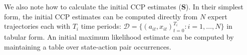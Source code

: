 \documentclass{article}
\begin{document}
We also note how to calculate the initial CCP estimates ($\mathbf{S}$). In their simplest form, the initial CCP estimates can be computed directly from $N$ expert trajectories each with $T_i$ time periods:  $\mathcal{D} = \{(a_{it},x_{it})_{t=0}^{T_i}:i=1,\dots,N\}$ in tabular form. An initial maximum likelihood estimate can be computed by maintaining a table over state-action pair occurrences.


\end{document}
